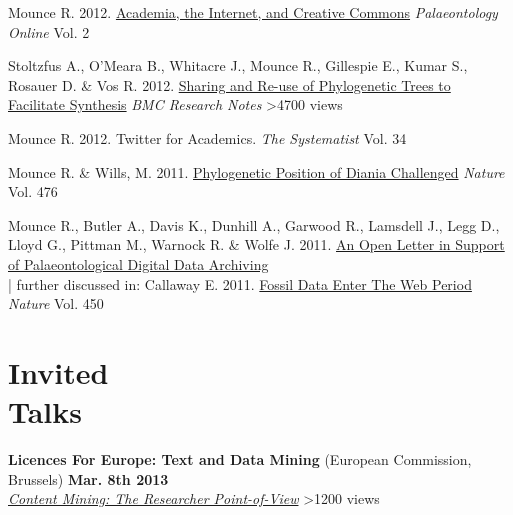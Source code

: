 \documentclass[margin,line]{resume}
\begin{document}
\begin{resume}
\vspace{-2mm}
    Mounce R. 2012.  \href{http://www.palaeontologyonline.com/articles/2012/life-as-a-palaeontologist-academia-the-internet-and-creative-commons/}{Academia, the Internet, and Creative Commons} \textsl{Palaeontology Online} Vol. 2

\vspace{-2mm}
    Stoltzfus A., O'Meara B., Whitacre J., Mounce R., Gillespie E., Kumar S., Rosauer D. \& Vos R. 2012. \href{http://dx.doi.org/10.1186/1756-0500-5-574}{Sharing and Re-use of Phylogenetic Trees to Facilitate Synthesis} \textsl{BMC Research Notes} \hfill {\color{red} \textgreater4700 views}

\vspace{-2mm}
    Mounce R. 2012. Twitter for Academics.
    \textsl{The Systematist} Vol. 34

\vspace{-2mm}
    Mounce R. \& Wills, M. 2011. \href{http://dx.doi.org/10.1038/nature10266}{Phylogenetic Position of Diania Challenged}
    \textsl{Nature} Vol. 476

\vspace{-2mm}
    Mounce R., Butler A., Davis K., Dunhill A., Garwood R., Lamsdell J., Legg D., Lloyd G., Pittman M., Warnock R. \& Wolfe J. 2011.
    \href{http://www.supportpalaeodataarchiving.co.uk/}{An Open Letter in Support of Palaeontological Digital Data Archiving} \\

\vspace{-6.5 mm} 
\vspace{-2mm} | further discussed in: Callaway E. 2011. \href{http://www.nature.com/news/2011/110411/full/472150a.html}{Fossil Data Enter The Web Period} \textsl{Nature} Vol. 450\\

\vspace{-7 mm}

    \section{\mysidestyle Invited\\Talks}

\textbf{Licences For Europe: Text and Data Mining} (European Commission, Brussels) \hfill \textbf{Mar. 8th 2013}\\
    \textsl{\href{http://www.slideshare.net/rossmounce/content-mining}{Content Mining: The Researcher Point-of-View}}  \hfill {\color{red}   	\textgreater 1200 views} \\ 


\end{resume}
\end{document}
